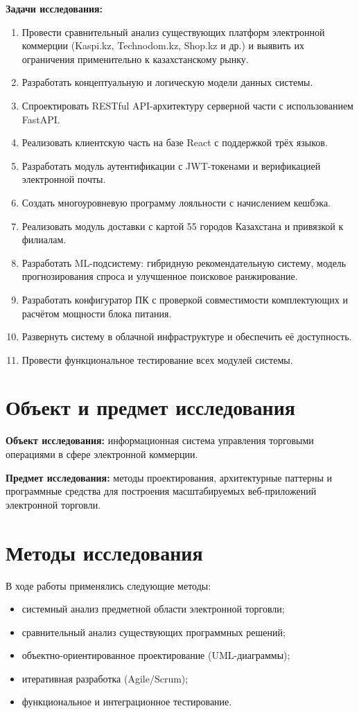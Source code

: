 \documentclass[14pt,a4paper]{extreport}
\begin{document}
\textbf{Задачи исследования:}
\begin{enumerate}
  \item Провести сравнительный анализ существующих платформ электронной коммерции (Kaspi.kz, Technodom.kz, Shop.kz и др.) и выявить их ограничения применительно к казахстанскому рынку.
  \item Разработать концептуальную и логическую модели данных системы.
  \item Спроектировать RESTful API-архитектуру серверной части с использованием FastAPI.
  \item Реализовать клиентскую часть на базе React с поддержкой трёх языков.
  \item Разработать модуль аутентификации с JWT-токенами и верификацией электронной почты.
  \item Создать многоуровневую программу лояльности с начислением кешбэка.
  \item Реализовать модуль доставки с картой 55 городов Казахстана и привязкой к филиалам.
  \item Разработать ML-подсистему: гибридную рекомендательную систему, модель прогнозирования спроса и улучшенное поисковое ранжирование.
  \item Разработать конфигуратор ПК с проверкой совместимости комплектующих и расчётом мощности блока питания.
  \item Развернуть систему в облачной инфраструктуре и обеспечить её доступность.
  \item Провести функциональное тестирование всех модулей системы.
\end{enumerate}

\section{Объект и предмет исследования}

\textbf{Объект исследования:} информационная система управления торговыми операциями в сфере электронной коммерции.

\textbf{Предмет исследования:} методы проектирования, архитектурные паттерны и программные средства для построения масштабируемых веб-приложений электронной торговли.

\section{Методы исследования}

В ходе работы применялись следующие методы:
\begin{itemize}
  \item системный анализ предметной области электронной торговли;
  \item сравнительный анализ существующих программных решений;
  \item объектно-ориентированное проектирование (UML-диаграммы);
  \item итеративная разработка (Agile/Scrum);
  \item функциональное и интеграционное тестирование.
\end{itemize}
\end{document}
